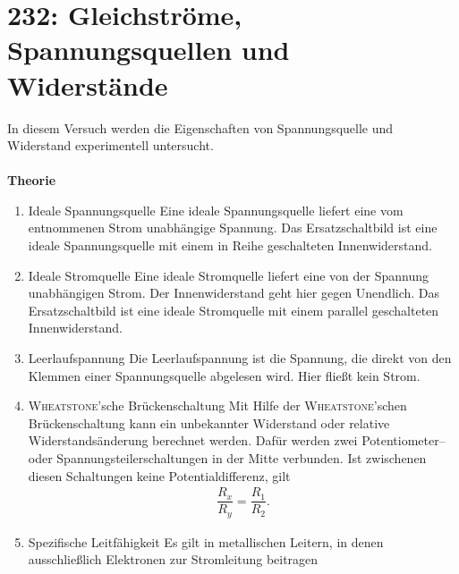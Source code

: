 
\newpage
\section{232: Gleichströme, Spannungsquellen und Widerstände}
In diesem Versuch werden die Eigenschaften von Spannungsquelle und Widerstand experimentell untersucht.\\\\
\textbf{Theorie} 
\begin{enumerate}[label=--]
        \item Ideale Spannungsquelle \hspace{25pt} 
                Eine ideale Spannungsquelle liefert eine vom entnommenen Strom unabhängige Spannung.
                Das Ersatzschaltbild ist eine ideale Spannungsquelle mit einem in Reihe geschalteten Innenwiderstand.
        \item Ideale Stromquelle \hspace{25pt} 
                Eine ideale Stromquelle liefert eine von der Spannung unabhängigen Strom.
                Der Innenwiderstand geht hier gegen Unendlich.
                Das Ersatzschaltbild ist eine ideale Stromquelle mit einem parallel geschalteten Innenwiderstand.
        \item Leerlaufspannung \hspace{25pt} 
                Die Leerlaufspannung ist die Spannung, die direkt von den Klemmen einer Spannungsquelle abgelesen wird.
                Hier fließt kein Strom.
        \item \textsc{Wheatstone}'sche Brückenschaltung \hspace{25pt} 
                Mit Hilfe der \textsc{Wheatstone}'schen Brückenschaltung kann ein unbekannter Widerstand oder relative Widerstandsänderung berechnet werden. 
                Dafür werden zwei Potentiometer-- oder Spannungsteilerschaltungen in der Mitte verbunden. 
                Ist zwischenen diesen Schaltungen keine Potentialdifferenz, gilt
                \begin{align} 
                        \dfrac{R_x}{R_y}=\dfrac{R_1}{R_2}
                .\end{align} 
        \item Spezifische Leitfähigkeit \hspace{25pt} 
                Es gilt in metallischen Leitern, in denen ausschließlich Elektronen zur Stromleitung beitragen

\end{enumerate}

